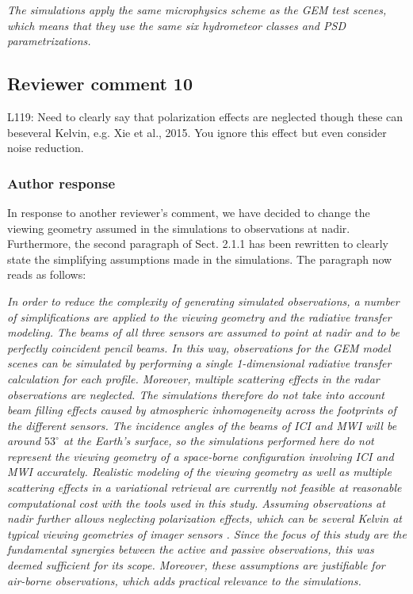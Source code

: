 \documentclass[11pt]{scrartcl}
\begin{document}
\textit{
The simulations apply the same microphysics scheme
as the GEM test scenes, which means that they use the same six hydrometeor classes
and PSD parametrizations.}


\subsection*{Reviewer comment 10}
L119: Need to clearly say that polarization effects are neglected though these can beseveral Kelvin, e.g.  Xie et al., 2015.  You ignore this effect but even consider noise reduction.

\subsubsection*{Author response}

In response to another reviewer's comment, we have decided to change the viewing
geometry assumed in the simulations to observations at nadir. Furthermore, the
second paragraph of Sect. 2.1.1 has been rewritten to clearly state the simplifying
assumptions made in the simulations. The paragraph now reads as follows:

\textit{In order to reduce the complexity of generating simulated observations, a number
of simplifications are applied to the viewing geometry and the radiative
transfer modeling. The beams of all three sensors are assumed to point at nadir
and to be perfectly coincident pencil beams. In this way, observations for the
GEM model scenes can be simulated by performing a single 1-dimensional radiative
transfer calculation for each profile. Moreover, multiple scattering effects in
the radar observations are neglected. The simulations therefore do not take into
account beam filling effects caused by atmospheric inhomogeneity across the
footprints of the different sensors. The incidence angles of the beams of ICI
and MWI will be around $53^\circ$ at the Earth's surface, so the simulations
performed here do not represent the viewing geometry of a space-borne
configuration involving ICI and MWI accurately. Realistic modeling of the
viewing geometry as well as multiple scattering effects in a variational
retrieval are currently not feasible at reasonable computational cost with the
tools used in this study. Assuming observations at nadir further allows neglecting
polarization effects, which can be several Kelvin at typical viewing geometries
of imager sensors \cite{xie15}. Since the focus of this study are the fundamental
synergies between the active and passive observations, this was deemed
sufficient for its scope. Moreover, these assumptions are justifiable for
air-borne observations, which adds practical relevance to the simulations.}
\end{document}
